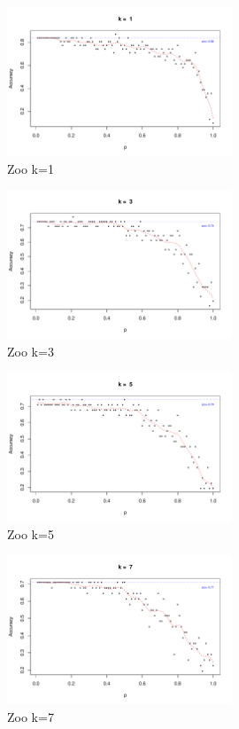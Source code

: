 \documentclass{article}
\begin{document}
\begin{figure}[h!]
 \centering
 \includegraphics[width=0.6\textwidth]{./figures/Zoo_k1.pdf}
 \caption{Zoo k=1}
 \label{fig:Zoo1}
\end{figure}
\begin{figure}[h!]
 \centering
 \includegraphics[width=0.6\textwidth]{./figures/Zoo_k3.pdf}
 \caption{Zoo k=3}
 \label{fig:Zoo3}
\end{figure}
\begin{figure}
 \centering
 \includegraphics[width=0.6\textwidth]{./figures/Zoo_k5.pdf}
 \caption{Zoo k=5}
 \label{fig:Zoo5}
\end{figure}
\begin{figure}
 \centering
 \includegraphics[width=0.6\textwidth]{./figures/Zoo_k7.pdf}
 \caption{Zoo k=7}
 \label{fig:Zoo7}
\end{figure}
\end{document}
